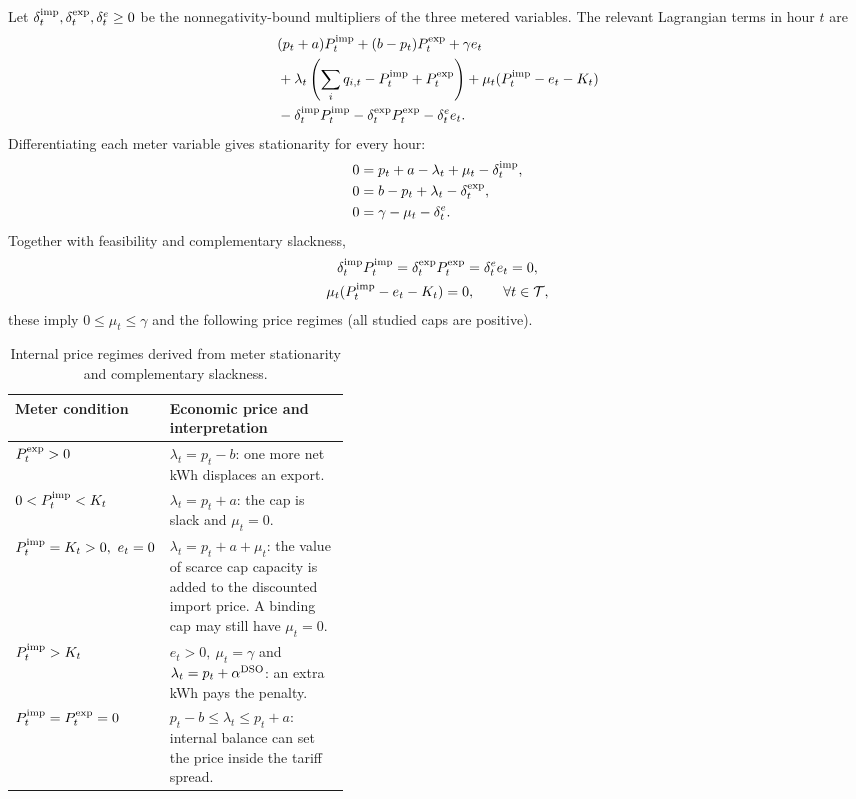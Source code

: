 \documentclass[10pt,a4paper]{article}
\begin{document}
Let $\delta_t^{\rm imp},\delta_t^{\rm exp},\delta_t^e\ge0$ be the nonnegativity-bound multipliers of the three metered variables. The relevant Lagrangian terms in hour $t$ are
\begin{equation}
\begin{split}
&(p_t+a)P_t^{\rm imp}+(b-p_t)P_t^{\rm exp}+\gamma e_t\\
&+\lambda_t\left(\sum_i q_{i,t}-P_t^{\rm imp}+P_t^{\rm exp}\right)
 +\mu_t(P_t^{\rm imp}-e_t-K_t)\\
&-\delta_t^{\rm imp}P_t^{\rm imp}-\delta_t^{\rm exp}P_t^{\rm exp}-\delta_t^e e_t .
\end{split}
\end{equation}
Differentiating each meter variable gives stationarity for every hour:
\begin{align}
0&=p_t+a-\lambda_t+\mu_t-\delta_t^{\rm imp},\label{eq:statimp}\\
0&=b-p_t+\lambda_t-\delta_t^{\rm exp},\label{eq:statexp}\\
0&=\gamma-\mu_t-\delta_t^e.\label{eq:state}
\end{align}
Together with feasibility and complementary slackness,
\begin{equation}
\begin{gathered}
\delta_t^{\rm imp}P_t^{\rm imp}=
\delta_t^{\rm exp}P_t^{\rm exp}=\delta_t^e e_t=0,\\
\mu_t(P_t^{\rm imp}-e_t-K_t)=0,\qquad \forall t\in\mathcal T,
\end{gathered}
\label{eq:comp}
\end{equation}
these imply $0\le\mu_t\le\gamma$ and the following price regimes (all studied caps are positive).
\begin{table}[H]
    \centering\small
    \caption{Internal price regimes derived from meter stationarity and complementary slackness.}
    \label{tab:regimes}
    \begin{tabularx}{\linewidth}{@{}p{0.39\linewidth}X@{}}
        \toprule
        Meter condition & Economic price and interpretation\\ \midrule
        $P_t^{\rm exp}>0$ & $\lambda_t=p_t-b$: one more net kWh displaces an export.\\
        $0<P_t^{\rm imp}<K_t$ & $\lambda_t=p_t+a$: the cap is slack and $\mu_t=0$.\\
        $P_t^{\rm imp}=K_t>0,\ e_t=0$ & $\lambda_t=p_t+a+\mu_t$: the value of scarce cap capacity is added to the discounted import price. A binding cap may still have $\mu_t=0$.\\
        $P_t^{\rm imp}>K_t$ & $e_t>0,\ \mu_t=\gamma$ and $\lambda_t=p_t+\alpha^{\rm DSO}$: an extra kWh pays the penalty.\\
        $P_t^{\rm imp}=P_t^{\rm exp}=0$ & $p_t-b\le\lambda_t\le p_t+a$: internal balance can set the price inside the tariff spread.\\
        \bottomrule
    \end{tabularx}
\end{table}
\end{document}
